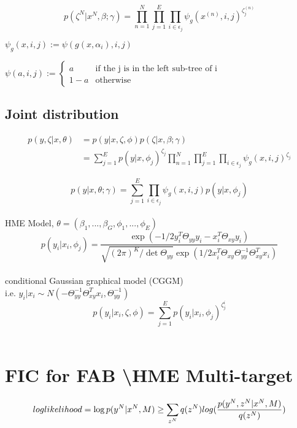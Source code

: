\documentclass{article}
\begin{document}
$$ p(\zeta^N|x^N,\beta;\gamma)=
	\prod_{n=1}^{N}
	\prod_{j=1}^E
	\prod_{i \in \epsilon_j}
		{\psi_g(x^{(n)},i,j)^{\zeta_j^{(n)}}} $$ 
		
\begin{description}
\setlength{\itemindent}{20em}
\item $ \psi_g(x,i,j):=\psi(g(x,\alpha_i),i,j) $ \\
\item $ \psi(a,i,j):= \begin{cases}
		a & \mbox{if the j is in the left sub-tree of i} \\
		1-a & \mbox{otherwise}
	\end{cases} $
\end{description}

\subsection{Joint distribution}

\begin{align*}
p(y,\zeta|x,\theta) & = p(y|x,\zeta,\phi)p(\zeta|x,\beta;\gamma) \\
	& = \sum_{j=1}^{E} p(y|x,\phi_j)^{\zeta_j}
		\prod_{n=1}^{N}
		\prod_{j=1}^E
		\prod_{i \in \epsilon_j}
		{\psi_g(x,i,j)^{\zeta_j}}
\end{align*} 

$$ p(y|x,\theta;\gamma)=\sum_{j=1}^E\prod_{i \in \epsilon_j}
	\psi_g(x,i,j)p(y|x,\phi_j)$$ \\
\hspace*{25em} HME Model, $ \theta = (\beta_1,...,\beta_G,\phi_1,...,\phi_E) $
$$ p(y_i|x_i,\phi_j)=\frac
	{\exp{(-1/2y_i^T\Theta_{yy}y_i - x_i^T\Theta_{xy}y_i)}}
	{\sqrt{(2\pi)^K/\det\Theta_{yy}}
		\exp{(1/2x_i^T\Theta_{xy}\Theta_{yy}^{-1}\Theta_{xy}^Tx_i)}}$$ \\
\hspace*{25em} conditional Gaussian graphical model (CGGM) \\
\hspace*{25em} i.e. $y_i|x_i \sim N(-\Theta_{yy}^{-1}\Theta_{xy}^Tx_i,\Theta_{yy}^{-1}) $ \\

$$ p(y_i|x_i,\zeta,\phi) = \sum_{j=1}^{E} p(y_i|x_i,\phi_j)^{\zeta_j^i}  $$ \\

\section{FIC for FAB \textbackslash HME Multi-target}
$$ log\-likelihood=\log{p(y^N|x^N,M)} \\
	\geq\sum_{z^N}q(z^N)log(\frac{p(y^N,z^N|x^N,M)}{q(z^N)}) $$ \\
\end{document}
